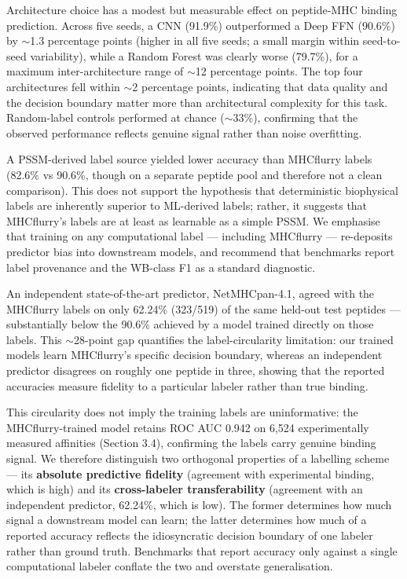 Architecture choice has a modest but measurable effect on peptide-MHC binding prediction. Across five seeds, a CNN (91.9\%) outperformed a Deep FFN (90.6\%) by $\sim$1.3 percentage points (higher in all five seeds; a small margin within seed-to-seed variability), while a Random Forest was clearly worse (79.7\%), for a maximum inter-architecture range of $\sim$12 percentage points. The top four architectures fell within $\sim$2 percentage points, indicating that data quality and the decision boundary matter more than architectural complexity for this task. Random-label controls performed at chance ($\sim$33\%), confirming that the observed performance reflects genuine signal rather than noise overfitting.

A PSSM-derived label source yielded lower accuracy than MHCflurry labels (82.6\% vs 90.6\%, though on a separate peptide pool and therefore not a clean comparison). This does not support the hypothesis that deterministic biophysical labels are inherently superior to ML-derived labels; rather, it suggests that MHCflurry's labels are at least as learnable as a simple PSSM. We emphasise that training on any computational label --- including MHCflurry --- re-deposits predictor bias into downstream models, and recommend that benchmarks report label provenance and the WB-class F1 as a standard diagnostic.

An independent state-of-the-art predictor, NetMHCpan-4.1, agreed with the MHCflurry labels on only 62.24\% (323/519) of the same held-out test peptides --- substantially below the 90.6\% achieved by a model trained directly on those labels. This $\sim$28-point gap quantifies the label-circularity limitation: our trained models learn MHCflurry's specific decision boundary, whereas an independent predictor disagrees on roughly one peptide in three, showing that the reported accuracies measure fidelity to a particular labeler rather than true binding.

This circularity does not imply the training labels are uninformative: the MHCflurry-trained model retains ROC AUC 0.942 on 6,524 experimentally measured affinities (Section 3.4), confirming the labels carry genuine binding signal. We therefore distinguish two orthogonal properties of a labelling scheme --- its \textbf{absolute predictive fidelity} (agreement with experimental binding, which is high) and its \textbf{cross-labeler transferability} (agreement with an independent predictor, 62.24\%, which is low). The former determines how much signal a downstream model can learn; the latter determines how much of a reported accuracy reflects the idiosyncratic decision boundary of one labeler rather than ground truth. Benchmarks that report accuracy only against a single computational labeler conflate the two and overstate generalisation.

